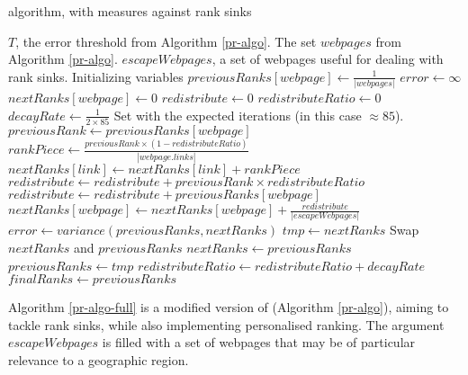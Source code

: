\begin{algorithm}
\end{algorithm}
\begin{algorithm}
    \caption{\pr{} algorithm, with measures against rank sinks}\label{pr-algo-full}
    \begin{algorithmic}[1]
    \Require $T$, the error threshold from Algorithm \ref{pr-algo}.
    \Require The set $webpages$ from Algorithm \ref{pr-algo}.
    \Require $escapeWebpages$, a set of webpages
        useful for dealing with rank sinks.
    \Comment Initializing variables
        \State $previousRanks[webpage] \gets \frac{1}{|webpages|}$
    \EndFor
    \State $error \gets \infty$\;
            \State $nextRanks[webpage] \gets 0$
        \EndFor
        \State $redistribute \gets 0$
        \State $redistributeRatio \gets 0$
        \State $decayRate \gets \frac{1}{2 \times 85}$
        \Comment Set with the expected iterations (in this case $\approx 85$).
            \State $previousRank \gets previousRanks[webpage]$
                \State $rankPiece \gets \frac{previousRank \times (1 - redistributeRatio)}{|webpage.links|}$
                    \State $nextRanks[link] \gets nextRanks[link] + rankPiece$
                \EndFor
                \State $redistribute \gets redistribute + previousRank \times redistributeRatio$
            \Else
                \State $redistribute \gets redistribute + previousRanks[webpage]$
            \EndIf
        \EndFor
            \State $nextRanks[webpage] \gets nextRanks[webpage] + \frac{redistribute}{|escapeWebpages|}$
        \EndFor
        \State $error \gets variance(previousRanks, nextRanks)$
        \State $tmp \gets nextRanks$
        \Comment Swap $nextRanks$ and $previousRanks$
        \State $nextRanks \gets previousRanks$
        \State $previousRanks \gets tmp$
        \State $redistributeRatio \gets redistributeRatio + decayRate$
    \EndWhile
    \State $finalRanks \gets previousRanks$
    \end{algorithmic}
\end{algorithm}

Algorithm \ref{pr-algo-full} is a modified version of \pr{} (Algorithm
\ref{pr-algo}), aiming to tackle rank sinks, while also implementing
personalised ranking.  The argument $escapeWebpages$ is filled with
a set of webpages that may be of particular relevance to a geographic
region.